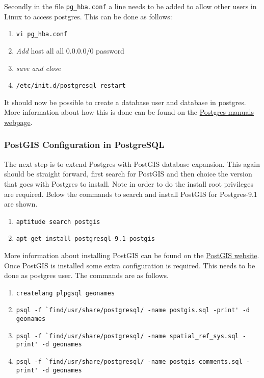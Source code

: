 \noindent Secondly in the file \lstinline$pg_hba.conf$ a line needs to be added to allow other users in Linux to access postgres. This can be done as follows:

\begin{enumerate}[resume]
	\item \lstinline$vi pg_hba.conf$
	\item \textit{Add} host all	all 0.0.0.0/0 password
	\item \textit{save and close}
	\item \lstinline$/etc/init.d/postgresql restart$
\end{enumerate}

\noindent It should now be possible to create a database user and database in postgres. More information about how this is done can be found on the \href{http://www.postgresql.org/docs/manuals/}{Postgres manuals webpage}.

\subsubsection{PostGIS Configuration in PostgreSQL}
The next step is to extend Postgres with PostGIS database expansion. This again should be straight forward, first search for PostGIS and then choice the version that goes with Postgres to install. Note in order to do the install root privileges are required. Below the commands to search and install PostGIS for Postgres-9.1 are shown.

\begin{enumerate}
	\item \lstinline$aptitude search postgis$
	\item \lstinline$apt-get install postgresql-9.1-postgis$
\end{enumerate} 

\noindent More information about installing PostGIS  can be found on the \href{http://www.postgis.net/install}{PostGIS website}.
\newline
\newline
Once PostGIS is installed some extra configuration is required. This needs to be done as postgres user. The commands are as follows.

\begin{enumerate}	
	\item \lstinline$createlang plpgsql geonames$
	\item \lstinline$psql -f `find/usr/share/postgresql/ -name postgis.sql -print' -d geonames$
	\item \lstinline$psql -f `find/usr/share/postgresql/ -name spatial_ref_sys.sql -print' -d geonames$
	\item \lstinline$psql -f `find/usr/share/postgresql/ -name postgis_comments.sql -print' -d geonames$
\end{enumerate}

